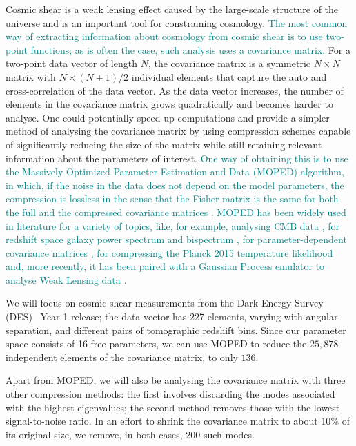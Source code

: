 \documentclass[twocolumn]{\docclass}
\begin{document}
	Cosmic shear is a weak lensing effect caused by the large-scale structure of the universe and is an important tool for constraining cosmology. \textcolor{teal}{The most common way of extracting information about cosmology from cosmic shear is to use two-point functions; as is often the case, such analysis uses a covariance matrix.} For a two-point data vector of length $N$, the covariance matrix is a symmetric $N\times N$ matrix with $N\times (N+1)/2$ individual elements that capture the auto and cross-correlation of the data vector. As the data vector increases, the number of elements in the covariance matrix grows quadratically and becomes harder to analyse. One could potentially speed up computations and provide a simpler method of analysing the covariance matrix by using compression schemes capable of significantly reducing the size of the matrix while still retaining relevant information about the parameters of interest. \textcolor{teal}{One way of obtaining this is to use the Massively Optimized Parameter Estimation and Data (MOPED) algorithm, in which, if the noise in the data does not depend on the model parameters, the compression is lossless in the sense that the Fisher matrix is the same for both the full and the compressed covariance matrices \cite{Heavens:2000hjl, Tegmark:1997maa}. MOPED has been widely used in literature for a variety of topics, like, for example, analysing CMB data \cite{Zablocki:2015zcm}, for redshift space galaxy power spectrum and bispectrum \cite{Gualdi:2018mjl}, for parameter-dependent covariance matrices \cite{Heavens:2017smv}, for compressing the Planck 2015 temperature likelihood \cite{Heather:2019d} and, more recently, it has been paired with a Gaussian Process emulator to analyse Weak Lensing data \cite{Mootoovaloo:2020}.}
	
	We will focus on cosmic shear measurements from the Dark Energy Survey (DES)~\cite{Troxel:2017xyo} Year 1 release; the data vector has 227 elements, varying with angular separation, and different pairs of tomographic redshift bins. Since our parameter space consists of 16 free parameters, we can use MOPED to reduce the $25,878$ independent elements of the covariance matrix, to only $136$.
	
	Apart from MOPED, we will also be analysing the covariance matrix with three other compression methods: the first involves discarding the modes associated with the highest eigenvalues; the second method removes those with the lowest signal-to-noise ratio. In an effort to shrink the covariance matrix to about $10\%$ of its original size, we remove, in both cases, 200 such modes.
	
\end{document}
